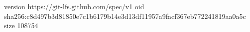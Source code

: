version https://git-lfs.github.com/spec/v1
oid sha256:c8d497b3d81850e7c1b6179b14e3d13df11957a9facf367eb772241819aa0a5c
size 108754
